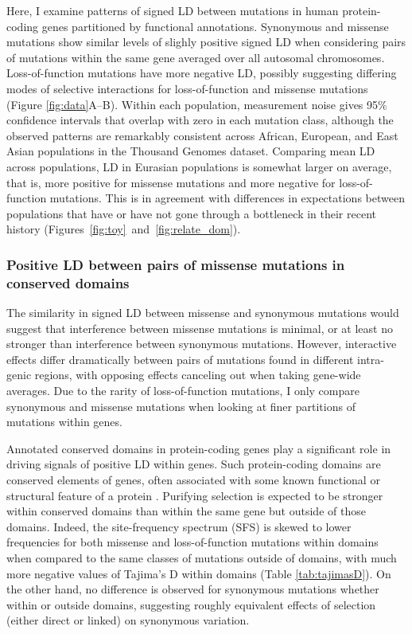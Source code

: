 \documentclass[]{article}
\begin{document}
Here, I examine patterns of signed LD between mutations in human protein-coding
genes partitioned by functional annotations. Synonymous and missense mutations
show similar levels of slighly positive signed LD when considering pairs of
mutations within the same gene averaged over all autosomal chromosomes.
Loss-of-function mutations have more negative LD, possibly suggesting differing
modes of selective interactions for loss-of-function and missense mutations
(Figure \ref{fig:data}A--B). Within each population, measurement noise gives
95\% confidence intervals that overlap with zero in each mutation class,
although the observed patterns are remarkably consistent across African,
European, and East Asian populations in the Thousand Genomes dataset. Comparing
mean LD across populations, LD in Eurasian populations is somewhat larger on
average, that is, more positive for missense mutations and more negative for
loss-of-function mutations. This is in agreement with differences in
expectations between populations that have or have not gone through a
bottleneck in their recent history
(Figures~\ref{fig:toy}~and~\ref{fig:relate_dom}).

\subsubsection{Positive LD between pairs of missense mutations in conserved domains}

The similarity in signed LD between missense and synonymous mutations would
suggest that interference between missense mutations is minimal, or at least no
stronger than interference between synonymous mutations. However, interactive
effects differ dramatically between pairs of mutations found in different
intra-genic regions, with opposing effects canceling out when taking gene-wide
averages. Due to the rarity of loss-of-function mutations, I only compare
synonymous and missense mutations when looking at finer partitions of mutations
within genes.

Annotated conserved domains in protein-coding genes play a significant role in
driving signals of positive LD within genes. Such protein-coding domains are
conserved elements of genes, often associated with some known functional or
structural feature of a protein \citep{Stanek2020-pa}. Purifying selection is
expected to be stronger within conserved domains than within the same gene but
outside of those domains. Indeed, the site-frequency spectrum (SFS) is skewed
to lower frequencies for both missense and loss-of-function mutations within
domains when compared to the same classes of mutations outside of domains, with
much more negative values of Tajima's D within domains (Table
\ref{tab:tajimasD}). On the other hand, no difference is observed for
synonymous mutations whether within or outside domains, suggesting roughly
equivalent effects of selection (either direct or linked) on synonymous
variation.
\end{document}
